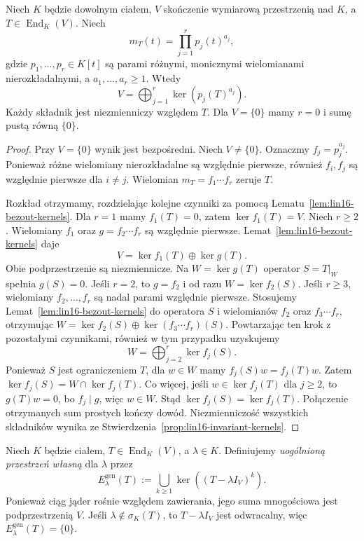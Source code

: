 \begin{twierdzenie}
\label{thm:lin16-primary}
Niech \(K\) będzie dowolnym ciałem,
\(V\) skończenie wymiarową przestrzenią
nad \(K\), a \(T\in\operatorname{End}_K(V)\).
Niech
\[
 m_T(t)=\prod_{j=1}^r p_j(t)^{a_j},
\]
gdzie \(p_1,\ldots,p_r\in K[t]\)
są parami różnymi, monicznymi
wielomianami nierozkładalnymi,
a \(a_1,\ldots,a_r\ge1\).
Wtedy
\[
 V=\bigoplus_{j=1}^r
              \ker(p_j(T)^{a_j}).
\]
Każdy składnik jest niezmienniczy
względem \(T\).
Dla \(V=\{0\}\) mamy \(r=0\)
i sumę pustą równą \(\{0\}\).
\end{twierdzenie}
\begin{proof}
Przy \(V=\{0\}\) wynik jest bezpośredni.
Niech \(V\ne\{0\}\).
Oznaczmy \(f_j=p_j^{a_j}\).
Ponieważ różne wielomiany nierozkładalne
są względnie pierwsze, również
\(f_i,f_j\) są względnie pierwsze
dla \(i\ne j\).
Wielomian \(m_T=f_1\cdots f_r\)
zeruje \(T\).

Rozkład otrzymamy, rozdzielając kolejne czynniki za pomocą Lematu~\ref{lem:lin16-bezout-kernels}.
Dla \(r=1\) mamy \(f_1(T)=0\), zatem
\(\ker f_1(T)=V\).
Niech \(r\ge2\).
Wielomiany \(f_1\) oraz
\(g=f_2\cdots f_r\) są względnie pierwsze.
Lemat~\ref{lem:lin16-bezout-kernels} daje
\[
 V=\ker f_1(T)\oplus\ker g(T).
\]
Obie podprzestrzenie są niezmiennicze.
Na \(W=\ker g(T)\) operator \(S=T|_W\)
spełnia \(g(S)=0\).
Jeśli \(r=2\), to \(g=f_2\)
i od razu \(W=\ker f_2(S)\).
Jeśli \(r\ge3\), wielomiany
\(f_2,\ldots,f_r\) są nadal parami
względnie pierwsze.
Stosujemy Lemat~\ref{lem:lin16-bezout-kernels}
do operatora \(S\) i wielomianów
\(f_2\) oraz \(f_3\cdots f_r\),
otrzymując
\(W=\ker f_2(S)\oplus
\ker(f_3\cdots f_r)(S)\).
Powtarzając ten krok z pozostałymi
czynnikami, również w tym przypadku
uzyskujemy
\[
 W=\bigoplus_{j=2}^r\ker f_j(S).
\]
Ponieważ \(S\) jest ograniczeniem \(T\),
dla \(w\in W\) mamy \(f_j(S)w=f_j(T)w\).
Zatem \(\ker f_j(S)=W\cap\ker f_j(T)\).
Co więcej, jeśli \(w\in\ker f_j(T)\)
dla \(j\ge2\), to \(g(T)w=0\),
bo \(f_j\mid g\), więc \(w\in W\).
Stąd \(\ker f_j(S)=\ker f_j(T)\).
Połączenie otrzymanych sum prostych
kończy dowód. Niezmienniczość
wszystkich składników wynika
ze Stwierdzenia~\ref{prop:lin16-invariant-kernels}.
\end{proof}

\begin{definicja}
\label{def:lin16-generalized-eigenspace}
Niech \(K\) będzie ciałem, \(T\in\operatorname{End}_K(V)\),
a \(\lambda\in K\).
Definiujemy \emph{uogólnioną przestrzeń własną}
dla \(\lambda\) przez
\[
 E_\lambda^{\mathrm{gen}}(T)
 :=\bigcup_{k\ge1}\ker((T-\lambda I_V)^k).
\]
Ponieważ ciąg jąder rośnie względem zawierania,
jego suma mnogościowa jest podprzestrzenią \(V\).
Jeśli \(\lambda\notin\sigma_K(T)\),
to \(T-\lambda I_V\) jest odwracalny,
więc \(E_\lambda^{\mathrm{gen}}(T)=\{0\}\).
\end{definicja}

